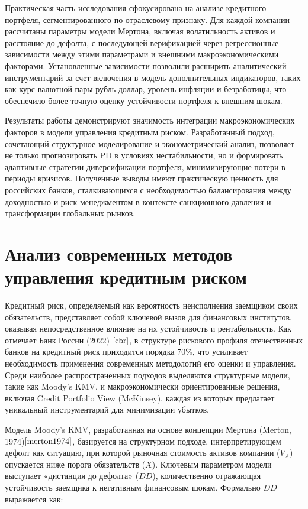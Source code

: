 \documentclass[]{article}
\begin{document}
	Практическая часть исследования сфокусирована на анализе кредитного портфеля, сегментированного по отраслевому признаку. Для каждой компании рассчитаны параметры модели Мертона, включая волатильность активов и расстояние до дефолта, с последующей верификацией через регрессионные зависимости между этими параметрами и внешними макроэкономическими факторами. Установленные зависимости позволили расширить аналитический инструментарий за счет включения в модель дополнительных индикаторов, таких как курс валютной пары рубль-доллар, уровень инфляции и безработицы, что обеспечило более точную оценку устойчивости портфеля к внешним шокам.  
	
	Результаты работы демонстрируют значимость интеграции макроэкономических факторов в модели управления кредитным риском. Разработанный подход, сочетающий структурное моделирование и эконометрический анализ, позволяет не только прогнозировать PD в условиях нестабильности, но и формировать адаптивные стратегии диверсификации портфеля, минимизирующие потери в периоды кризисов. Полученные выводы имеют практическую ценность для российских банков, сталкивающихся с необходимостью балансирования между доходностью и риск-менеджментом в контексте санкционного давления и трансформации глобальных рынков.
	
	
	
	\section{Анализ современных методов управления кредитным риском}
	
	Кредитный риск, определяемый как вероятность неисполнения заемщиком своих обязательств, представляет собой ключевой вызов для финансовых институтов, оказывая непосредственное влияние на их устойчивость и рентабельность. Как отмечает Банк России (2022) $\cite{cbr}$, в структуре рискового профиля отечественных банков на кредитный риск приходится порядка 70\%, что усиливает необходимость применения современных методологий его оценки и управления. Среди наиболее распространенных подходов выделяются структурные модели, такие как Moody’s KMV, и макроэкономически ориентированные решения, включая Credit Portfolio View (McKinsey), каждая из которых предлагает уникальный инструментарий для минимизации убытков.  
	
	Модель Moody’s KMV, разработанная на основе концепции Мертона (Merton, 1974)$\cite{merton1974}$, базируется на структурном подходе, интерпретирующем дефолт как ситуацию, при которой рыночная стоимость активов компании (\(V_A\)) опускается ниже порога обязательств (\(X\)). Ключевым параметром модели выступает «дистанция до дефолта» (\(DD\)), количественно отражающая устойчивость заемщика к негативным финансовым шокам. Формально \(DD\) выражается как:  
	
\end{document}
